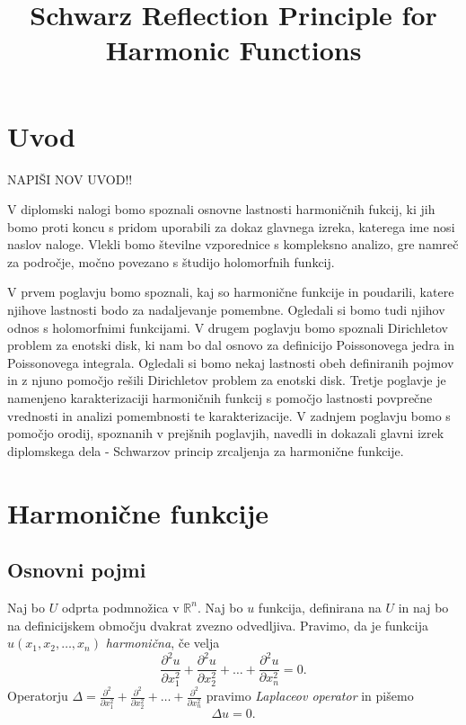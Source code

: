 \documentclass[mat1, tisk]{fmfdelo}
\title{Schwarz Reflection Principle for Harmonic Functions}
\begin{document}
\section{Uvod}

NAPIŠI NOV UVOD!!

V diplomski nalogi bomo spoznali osnovne lastnosti harmoničnih fukcij, ki jih bomo proti koncu s pridom uporabili za dokaz glavnega izreka, katerega ime nosi naslov naloge.
Vlekli bomo številne vzporednice s kompleksno analizo, gre namreč za področje, močno povezano s študijo holomorfnih funkcij.

V prvem poglavju bomo spoznali, kaj so harmonične funkcije in poudarili, katere njihove lastnosti bodo za nadaljevanje pomembne. Ogledali si bomo tudi njihov odnos s holomorfnimi funkcijami. 
V drugem poglavju bomo spoznali Dirichletov problem za enotski disk, ki nam bo dal osnovo za definicijo Poissonovega jedra in Poissonovega integrala. Ogledali si bomo nekaj lastnosti obeh definiranih pojmov in z njuno pomočjo rešili Dirichletov problem za enotski disk.
Tretje poglavje je namenjeno karakterizaciji harmoničnih funkcij s pomočjo lastnosti povprečne vrednosti in analizi pomembnosti te karakterizacije. 
V zadnjem poglavju bomo s pomočjo orodij, spoznanih v prejšnih poglavjih, navedli in dokazali glavni izrek diplomskega dela - Schwarzov princip zrcaljenja za harmonične funkcije.
\section{Harmonične funkcije}
\subsection{Osnovni pojmi}
    \begin{definicija}
        \label{harm}
        Naj bo $U$ odprta podmnožica v $\mathbb{R}^n$. Naj bo $u$ funkcija, definirana na $U$ in naj bo na definicijskem območju dvakrat zvezno odvedljiva.  
        Pravimo, da je funkcija $u(x_1, x_2, \dots, x_n)$ \emph{harmonična}, če velja
        $$
        \frac{\partial^2 u}{\partial x_1 ^ 2} +  \frac{\partial^2 u}{\partial x_2 ^ 2} + \dots + \frac{\partial^2 u}{\partial x_n ^ 2} = 0.
        $$
        Operatorju $\Delta  = \frac{\partial^2}{\partial x_1 ^ 2} +  \frac{\partial^2}{\partial x_2 ^ 2} + \dots + \frac{\partial^2}{\partial x_n ^ 2}$ pravimo \emph{Laplaceov operator} in pišemo
        $$
        \Delta u = 0.
        $$
    \end{definicija}
\end{document}
